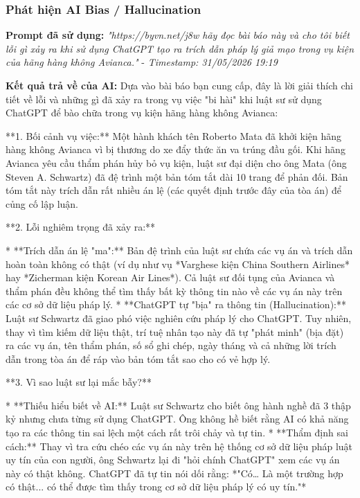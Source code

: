 \subsubsection{Phát hiện AI Bias / Hallucination}
\textbf{Prompt đã sử dụng:} \textit{"{https://byvn.net/j8w} hãy đọc bài báo này và cho tôi biết lỗi gì xảy ra khi sử dụng ChatGPT tạo ra trích dẫn pháp lý giả mạo trong vụ kiện của hãng hàng không Avianca."} - \textit{Timestamp: 31/05/2026 19:19}

\textbf{Kết quả trả về của AI:}
Dựa vào bài báo bạn cung cấp, đây là lời giải thích chi tiết về lỗi và những gì đã xảy ra trong vụ việc "bi hài" khi luật sư sử dụng ChatGPT để bào chữa trong vụ kiện hãng hàng không Avianca:

**1. Bối cảnh vụ việc:**
Một hành khách tên Roberto Mata đã khởi kiện hãng hàng không Avianca vì bị thương do xe đẩy thức ăn va trúng đầu gối. Khi hãng Avianca yêu cầu thẩm phán hủy bỏ vụ kiện, luật sư đại diện cho ông Mata (ông Steven A. Schwartz) đã đệ trình một bản tóm tắt dài 10 trang để phản đối. Bản tóm tắt này trích dẫn rất nhiều án lệ (các quyết định trước đây của tòa án) để củng cố lập luận.

**2. Lỗi nghiêm trọng đã xảy ra:**

* **Trích dẫn án lệ "ma":** Bản đệ trình của luật sư chứa các vụ án và trích dẫn hoàn toàn không có thật (ví dụ như vụ *Varghese kiện China Southern Airlines* hay *Zicherman kiện Korean Air Lines*). Cả luật sư đối tụng của Avianca và thẩm phán đều không thể tìm thấy bất kỳ thông tin nào về các vụ án này trên các cơ sở dữ liệu pháp lý.
* **ChatGPT tự "bịa" ra thông tin (Hallucination):** Luật sư Schwartz đã giao phó việc nghiên cứu pháp lý cho ChatGPT. Tuy nhiên, thay vì tìm kiếm dữ liệu thật, trí tuệ nhân tạo này đã tự "phát minh" (bịa đặt) ra các vụ án, tên thẩm phán, số sổ ghi chép, ngày tháng và cả những lời trích dẫn trong tòa án để ráp vào bản tóm tắt sao cho có vẻ hợp lý.

**3. Vì sao luật sư lại mắc bẫy?**

* **Thiếu hiểu biết về AI:** Luật sư Schwartz cho biết ông hành nghề đã 3 thập kỷ nhưng chưa từng sử dụng ChatGPT. Ông không hề biết rằng AI có khả năng tạo ra các thông tin sai lệch một cách rất trôi chảy và tự tin.
* **Thẩm định sai cách:** Thay vì tra cứu chéo các vụ án này trên hệ thống cơ sở dữ liệu pháp luật uy tín của con người, ông Schwartz lại đi "hỏi chính ChatGPT" xem các vụ án này có thật không. ChatGPT đã tự tin nói dối rằng: *"Có… Là một trường hợp có thật... có thể được tìm thấy trong cơ sở dữ liệu pháp lý có uy tín."*

